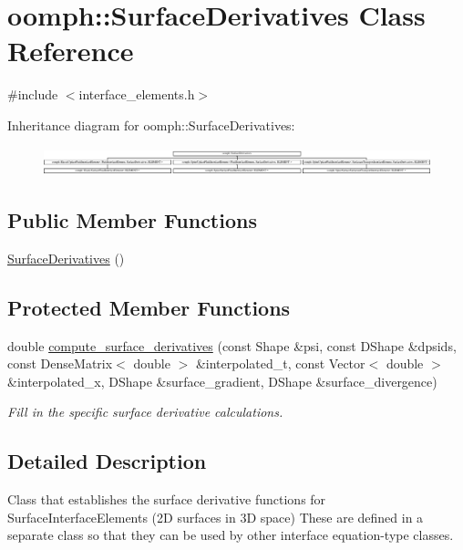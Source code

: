 \hypertarget{classoomph_1_1SurfaceDerivatives}{}\section{oomph\+:\+:Surface\+Derivatives Class Reference}
\label{classoomph_1_1SurfaceDerivatives}


{\ttfamily \#include $<$interface\+\_\+elements.\+h$>$}

Inheritance diagram for oomph\+:\+:Surface\+Derivatives\+:\begin{figure}[H]
\begin{center}
\leavevmode
\includegraphics[height=0.834575cm]{classoomph_1_1SurfaceDerivatives}
\end{center}
\end{figure}
\subsection*{Public Member Functions}
\begin{DoxyCompactItemize}
\item 
\hyperlink{classoomph_1_1SurfaceDerivatives_a7bd520c805a4444073f5b05501d747fd}{Surface\+Derivatives} ()
\end{DoxyCompactItemize}
\subsection*{Protected Member Functions}
\begin{DoxyCompactItemize}
\item 
double \hyperlink{classoomph_1_1SurfaceDerivatives_a44e841bfa4ad82dcb87e672c821ffde7}{compute\+\_\+surface\+\_\+derivatives} (const Shape \&psi, const D\+Shape \&dpsids, const Dense\+Matrix$<$ double $>$ \&interpolated\+\_\+t, const Vector$<$ double $>$ \&interpolated\+\_\+x, D\+Shape \&surface\+\_\+gradient, D\+Shape \&surface\+\_\+divergence)
\begin{DoxyCompactList}\small\item\em Fill in the specific surface derivative calculations. \end{DoxyCompactList}\end{DoxyCompactItemize}


\subsection{Detailed Description}
Class that establishes the surface derivative functions for Surface\+Interface\+Elements (2D surfaces in 3D space) These are defined in a separate class so that they can be used by other interface equation-\/type classes. 


